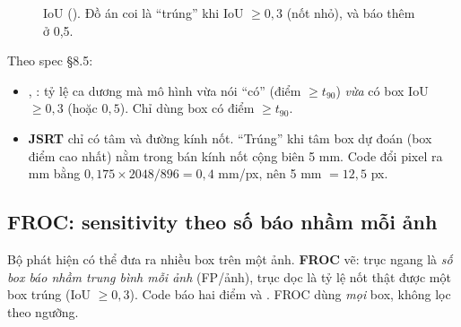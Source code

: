 \begin{figure}[H]
\centering
{}
\caption{IoU (). Đồ án coi là ``trúng'' khi IoU $\ge 0{,}3$ (nốt nhỏ), và báo thêm ở 0,5.}
\label{fig:iou}
\end{figure}

Theo spec §8.5:
\begin{itemize}
\item {}, : tỷ lệ ca dương mà mô hình vừa nói ``có'' (điểm $\ge t_{90}$) \emph{vừa} có box IoU $\ge 0{,}3$ (hoặc $0{,}5$). Chỉ dùng box có điểm $\ge t_{90}$.
\item \textbf{JSRT} chỉ có tâm và đường kính nốt. ``Trúng'' khi tâm box dự đoán (box điểm cao nhất) nằm trong bán kính nốt cộng biên 5 mm.
      Code đổi pixel ra mm bằng $0{,}175 \times 2048 / 896 = 0{,}4$ mm/px, nên 5 mm $= 12{,}5$ px.
\end{itemize}

\subsection{FROC: sensitivity theo số báo nhầm mỗi ảnh}
\label{sec:froc}

Bộ phát hiện có thể đưa ra nhiều box trên một ảnh. \textbf{FROC}  vẽ: trục ngang là \emph{số box báo nhầm trung bình mỗi ảnh}
(FP/ảnh), trục dọc là tỷ lệ nốt thật được một box trúng (IoU $\ge 0{,}3$). Code báo hai điểm  và .
FROC dùng \emph{mọi} box, không lọc theo ngưỡng.

